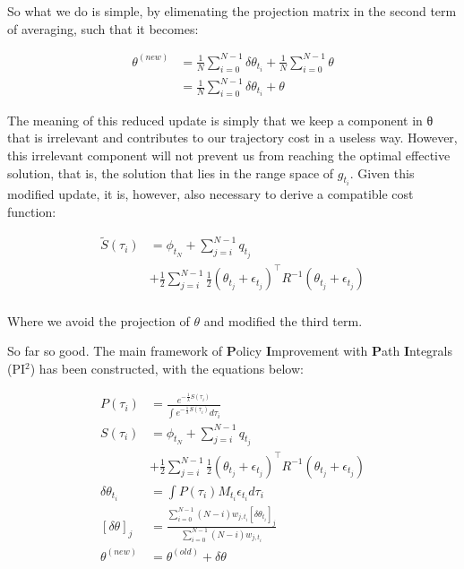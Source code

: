 \documentclass[journal]{IEEEtran}
\begin{document}
 So what we do is simple, by elimenating the projection matrix in the second term of averaging, such that it becomes:


 \begin{equation}
  \begin{aligned}
  \theta^{(new)} &= \frac{1}{N} \sum_{i = 0}^{N-1} \delta \theta_{t_i} + \frac{1}{N} \sum_{i = 0}^{N-1} \theta \\
  & = \frac{1}{N} \sum_{i = 0}^{N-1} \delta \theta_{t_i} + \theta
  \end{aligned}
 \end{equation}

 The meaning of this reduced update is simply that we keep a component in θ that is irrelevant and contributes to our trajectory cost in a useless way. However, this irrelevant component will not prevent us from reaching the optimal effective solution, 
 that is, the solution that lies in the range space of $g_{t_i}$. Given this modified update, it is, however, also necessary to derive a compatible cost function:


\begin{equation}
  \begin{aligned}
    \tilde{S}(\tau_i)& = \phi_{t_N}+\sum_{j=i}^{N-1}q_{t_j} \\ & + \frac{1}{2}\sum_{j=i}^{N-1}  \frac{1}{2}(\theta_{t_j} + \epsilon_{t_j})^{\top}{R}^{-1} (\theta_{t_j} + \epsilon_{t_j})\\ 
  \end{aligned}
\end{equation}

Where we avoid the projection of $\theta$ and modified the third term.

So far so good. The main framework of \textbf{P}olicy \textbf{I}mprovement with \textbf{P}ath \textbf{I}ntegrals (PI$^2$) has been constructed, with the equations below:

\begin{equation}
  \begin{aligned}
    P(\tau_i) & = \frac{e^{-\frac{1}{\lambda}S(\tau_i)}  }{\int e^{-\frac{1}{\lambda}S(\tau_i)}d\tau_i} \nonumber  \\
   S (\tau_i)& = \phi_{t_N}+\sum_{j=i}^{N-1}q_{t_j} \\ & + \frac{1}{2}\sum_{j=i}^{N-1}  \frac{1}{2}(\theta_{t_j} + \epsilon_{t_j})^{\top}{R}^{-1} (\theta_{t_j} + \epsilon_{t_j})\\ 
   \delta \theta_{t_i} & = \int P(\tau_i) M_{t_i} \epsilon_{t_i} d\tau_i \\
   [\delta \theta ]_j &=  \frac{\sum_{ i= 0}^{N-1}(N-i)w_{j, t_i}[\delta \theta_{t_i}]_j}{\sum_{ i= 0}^{N-1}(N-i)w_{j, t_i}} \\ 
   \theta^{(new)} & = \theta^{(old)} + \delta \theta
  \end{aligned}
\end{equation}
\end{document}
